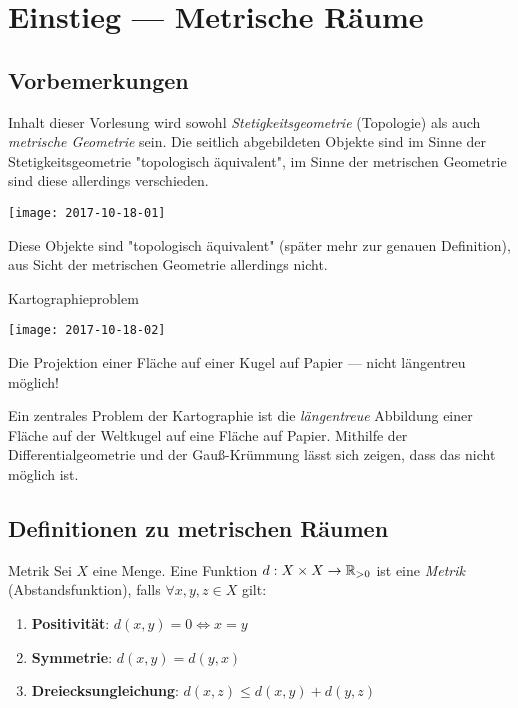 \chapter{Einstieg --- Metrische Räume}

\section{Vorbemerkungen}

Inhalt dieser Vorlesung wird sowohl \emph{Stetigkeitsgeometrie} (Topologie) als auch \emph{metrische Geometrie} sein. Die seitlich abgebildeten Objekte sind im Sinne der Stetigkeitsgeometrie "topologisch äquivalent", im Sinne der metrischen Geometrie sind diese allerdings verschieden.
\begin{marginfigure}
    \texttt{[image: 2017-10-18-01]}
    \caption{Diese Objekte sind "topologisch äquivalent" (später mehr zur genauen Definition), aus Sicht der metrischen Geometrie allerdings nicht.}
\end{marginfigure}

\begin{bla}{Kartographieproblem}
  \begin{marginfigure}
    \centering
    \texttt{[image: 2017-10-18-02]}
    \caption{Die Projektion einer Fläche auf einer Kugel auf Papier --- nicht längentreu möglich!}
  \end{marginfigure}
  Ein zentrales Problem der Kartographie ist die \emph{längentreue} Abbildung einer Fläche auf der Weltkugel auf eine Fläche auf Papier. Mithilfe der Differentialgeometrie und der Gauß-Krümmung lässt sich zeigen, dass das nicht möglich ist.
\end{bla}

\section{Definitionen zu metrischen Räumen}

\begin{definition}{Metrik}
  Sei $ X $ eine Menge. Eine Funktion $ d: X \times X \to \mathbb{R}_{>0} $ ist eine \emph{Metrik} (Abstandsfunktion), falls $ \forall x, y, z \in X $ gilt:
  \begin{enumerate}
    \item \textbf{Positivität}: $ d(x, y) = 0 \Leftrightarrow x = y $ 
    \item \textbf{Symmetrie}: $ d(x,y) = d(y,x) $
    \item \textbf{Dreiecksungleichung}: $ d(x,z) \leq d(x,y) + d(y,z) $
  \end{enumerate}
\end{definition}


